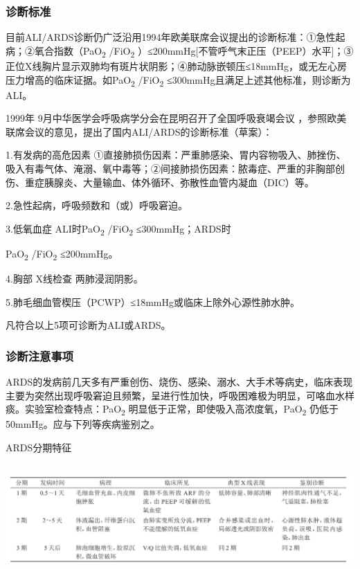 \subsubsection{诊断标准}

目前ALI/ARDS诊断仍广泛沿用1994年欧美联席会议提出的诊断标准：①急性起病；②氧合指数（PaO\textsubscript{2}
/FiO\textsubscript{2}
）≤200mmHg{[}不管呼气末正压（PEEP）水平{]}；③正位X线胸片显示双肺均有斑片状阴影；④肺动脉嵌顿压≤18mmHg，或无左心房压力增高的临床证据。如PaO\textsubscript{2}
/FiO\textsubscript{2} ≤300mmHg且满足上述其他标准，则诊断为ALI。

1999年 9月中华医学会呼吸病学分会在昆明召开了全国呼吸衰竭会议
，参照欧美联席会议的意见，提出了国内ALI/ARDS的诊断标准（草案）：

1.有发病的高危因素
①直接肺损伤因素：严重肺感染、胃内容物吸入、肺挫伤、吸入有毒气体、淹溺、氧中毒等；②间接肺损伤因素：脓毒症、严重的非胸部创伤、重症胰腺炎、大量输血、体外循环、弥散性血管内凝血（DIC）等。

2.急性起病，呼吸频数和（或）呼吸窘迫。

3.低氧血症 ALI时PaO\textsubscript{2} /FiO\textsubscript{2}
≤300mmHg；ARDS时

PaO\textsubscript{2} /FiO\textsubscript{2} ≤200mmHg。

4.胸部 X线检查 两肺浸润阴影。

5.肺毛细血管楔压（PCWP）≤18mmHg或临床上除外心源性肺水肿。

凡符合以上5项可诊断为ALI或ARDS。

\subsubsection{诊断注意事项}

ARDS的发病前几天多有严重创伤、烧伤、感染、溺水、大手术等病史，临床表现主要为突然出现呼吸窘迫且频繁，呈进行性加快，呼吸困难极为明显，可咯血水样痰。实验室检查特点：PaO\textsubscript{2}
明显低于正常，即使吸入高浓度氧，PaO\textsubscript{2}
仍低于50mmHg。应与下列等疾病鉴别之。

\begin{table}[htbp]
\centering
\caption{ARDS分期特征}
\label{tab29-1}
\includegraphics[width=6.69792in,height=1.67708in]{./images/Image00114.jpg}
\end{table}

